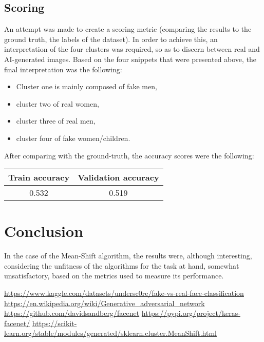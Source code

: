 \documentclass{article}
\begin{document}
\subsection{Scoring}
An attempt was made to create a scoring metric (comparing
the results to the ground truth, the labels of the dataset). In order to achieve this, an interpretation of the four clusters was required, so as to discern between real and AI-generated images. Based on the four snippets that were presented above, the final interpretation was the following:
\begin{itemize}
	\item Cluster one is mainly composed of fake men,
	\item cluster two of real women,
	\item cluster three of real men,
	\item cluster four of fake women/children. 
\end{itemize}

After comparing with the ground-truth, the accuracy scores were the following:

\begin{center}
\begin{tabular}{||c|c||} 
 \hline
 Train accuracy & Validation accuracy \\
 \hline\hline
 0.532 & 0.519 \\
 \hline
\end{tabular}
\end{center}

\newpage

\section{Conclusion}
In the case of the Mean-Shift algorithm, the results were, although interesting, considering the unfitness of the algorithms for the task at hand, somewhat unsatisfactory, based on the metrics used to measure its performance.




\begin{thebibliography}{1.7} 
	\url{https://www.kaggle.com/datasets/undersc0re/fake-vs-real-face-classification}
	\url{https://en.wikipedia.org/wiki/Generative_adversarial_network}
	\url{https://github.com/davidsandberg/facenet}
	\url{https://pypi.org/project/keras-facenet/}
	\url{https://scikit-learn.org/stable/modules/generated/sklearn.cluster.MeanShift.html}
\end{thebibliography}
\end{document}
